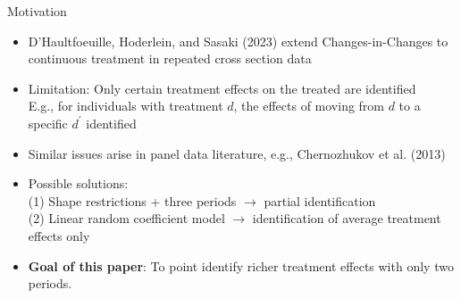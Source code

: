 \documentclass[aspectratio=1610, 9pt]{beamer}
\begin{document}
\begin{frame}{Motivation}
    \begin{itemize}
        \item D’Haultfoeuille, Hoderlein, and Sasaki (2023) extend Changes-in-Changes to continuous treatment in repeated cross section data
   \vspace{0.1cm}
   \item Limitation: Only certain treatment effects on the treated are identified \\
       E.g., for individuals with treatment $d$, the effects of moving from $d$ to a specific $d^\prime$ identified

         \vspace{0.1cm}
    
    \item Similar issues arise in panel data literature, e.g., Chernozhukov et al. (2013)
     \vspace{0.1cm}

\item Possible solutions:\\
     (1) Shape restrictions + three periods $\rightarrow$ partial identification\\
   (2) Linear random coefficient model $\rightarrow$  identification of average treatment effects only
   
 \vspace{0.1cm}
        \item   \textbf{Goal of this paper}: To point identify richer treatment effects with only two periods.
    \end{itemize}
\end{frame}

      
\end{document}

